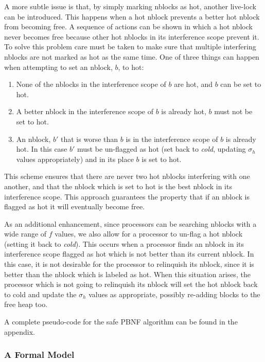\documentclass{article}
\begin{document}
 A more subtle issue is that, by simply marking nblocks as hot, another
 live-lock can be introduced.  This happens when a hot nblock prevents
 a better hot nblock from becoming free.  A sequence of actions can be
 shown in which a hot nblock never becomes free because other hot
 nblocks in its interference scope prevent it.  To solve this problem
 care must be taken to make sure that multiple interfering nblocks are
 not marked as hot as the same time.  One of three things can happen
 when attempting to set an nblock, $b$, to hot:
 \begin{enumerate}
 \item None of the nblocks in the interference scope of $b$ are hot,
   and $b$ can be set to hot.
 \item A better nblock in the interference scope of $b$ is already hot,
   $b$ must not be set to hot.
 \item An nblock, $b'$ that is worse than $b$ is in the interference
   scope of $b$ is already hot.  In this case $b'$ must be un-flagged
   as hot (set back to \emph{cold}, updating $\sigma_h$ values
   appropriately) and in its place $b$ is set to hot.
 \end{enumerate}
 This scheme ensures that there are never two hot nblocks interfering
 with one another, and that the nblock which is set to hot is the best
 nblock in its interference scope.  This approach guarantees the
 property that if an nblock is flagged as hot it will eventually become
 free.

 As an additional enhancement, since processors can be searching
 nblocks with a wide range of $f$ values, we also allow for a processor
 to un-flag a hot nblock (setting it back to \emph{cold}).  This occurs
 when a processor finds an nblock in its interference scope flagged as
 hot which is not better than its current nblock.  In this case, it is
 not desirable for the processor to relinquish its nblock, since it is
 better than the nblock which is labeled as hot.  When this situation
 arises, the processor which is not going to relinquish its nblock will
 set the hot nblock back to cold and update the $\sigma_h$ values as
 appropriate, possibly re-adding blocks to the free heap too.

 A complete pseudo-code for the safe PBNF algorithm can be found in the
 appendix.

 \subsubsection{A Formal Model}
\end{document}
